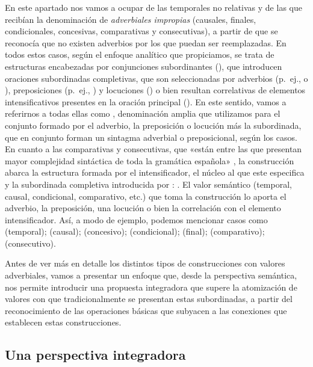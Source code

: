 En este apartado nos vamos a ocupar de las temporales no relativas y de las que
recibían la denominación de \textit{adverbiales impropias} (causales, finales,
condicionales, concesivas, comparativas y consecutivas), a partir de que se
reconocía que no existen adverbios por los que puedan ser reemplazadas. En todos
estos casos, según el enfoque analítico que propiciamos, se trata de estructuras
encabezadas por conjunciones subordinantes (), que introducen
oraciones subordinadas completivas, que son seleccionadas por adverbios (p.~ej.,
 o ), preposiciones (p.~ej., ) y locuciones () o bien resultan correlativas de
elementos intensificativos presentes en la oración principal (). En este sentido, vamos a referirnos a todas ellas como
, denominación amplia que
utilizamos para el conjunto formado por el adverbio, la preposición o locución
más la subordinada, que en conjunto forman un sintagma adverbial o
preposicional, según los casos. En cuanto a las comparativas y consecutivas, que
«están entre las que presentan mayor complejidad sintáctica de toda la gramática
española» \parencite[§\,45.1a]{rae2025}, la construcción abarca la estructura
formada por el intensificador, el núcleo al que este especifica y la subordinada
completiva introducida por : . El valor semántico (temporal, causal, condicional,
comparativo, etc.) que toma la construcción lo aporta el adverbio, la
preposición, una locución o bien la correlación con el elemento intensificador.
Así, a modo de ejemplo, podemos mencionar casos como  (temporal);  (causal);  (concesivo);  (condicional);  (final);  (comparativo);
 (consecutivo).

Antes de ver más en detalle los distintos tipos de construcciones con valores
adverbiales, vamos a presentar un enfoque que, desde la perspectiva semántica,
nos permite introducir una propuesta integradora que supere la atomización de
valores con que tradicionalmente se presentan estas subordinadas, a partir del
reconocimiento de las operaciones básicas que subyacen a las conexiones que
establecen estas construcciones.

\subsection{Una perspectiva integradora}\label{sec:13-integradora}

